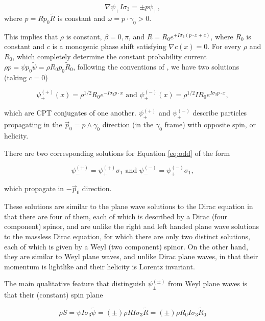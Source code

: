 \documentclass{article}
\begin{document}
  \begin{equation}
    \nabla \psi_+ I \sigma_3 = \pm p \psi_+,\label{eq:plane}
  \end{equation}
  where $p = R p_0 \widetilde R$ is constant and $\omega = p \cdot \gamma_0 > 0$.

  This implies that $\rho$ is constant, $\beta = 0, \pi$, and $R = R_0 e^{\mp I \sigma_3 (p \cdot x + c)}$, where $R_0$ is constant and $c$ is a monogenic phase shift satisfying $\nabla c(x) = 0$. For every $\rho$ and $R_0$, which completely determine the constant probability current $\rho p = \psi p_0 \widetilde \psi = \rho R_0 p_0 \widetilde R_0$, following the conventions of \cite{gap}, we have two solutions (taking $c = 0$)

  \begin{equation}
    \psi^{(+)}_+(x) = \rho^{1/2} R_0 e^{- I \sigma_3 p \cdot x} \text { and } \psi^{(-)}_+(x) = \rho^{1/2} I R_0 e^{I \sigma_3 p \cdot x},
  \end{equation} 

  which are CPT conjugates of one another. $\psi^{(+)}_+$ and $\psi^{(-)}_+$ describe particles propagating in the $\vec p_0 = p \wedge \gamma_0$ direction (in the $\gamma_0$ frame) with opposite spin, or helicity.

  There are two corresponding solutions for Equation \ref{eq:odd} of the form

  \begin{equation}
    \psi^{(+)}_- = \psi^{(+)}_+ \sigma_1 \text{ and }
    \psi^{(-)}_- = \psi^{(-)}_+ \sigma_1,
  \end{equation}

  which propagate in $-\vec p_0$ direction.

  These solutions are similar to the plane wave solutions to the Dirac equation in that there are four of them, each of which is described by a Dirac (four component) spinor, and are unlike the right and left handed plane wave solutions to the massless Dirac equation, for which there are only two distinct solutions, each of which is given by a Weyl (two component) spinor. On the other hand, they are similar to Weyl plane waves, and unlike Dirac plane waves, in that their momentum is lightlike and their helicity is Lorentz invariant.

  The main qualitative feature that distinguish $\psi^{(\pm)}_{\pm}$ from Weyl plane waves is that their (constant) spin plane 

  \begin{equation}
    \rho S = \psi I \sigma_3 \widetilde \psi = (\pm) \rho  R I \sigma_3 \widetilde R = (\pm) \rho R_0 I \sigma_3 \widetilde R_0
  \end{equation}
\end{document}
